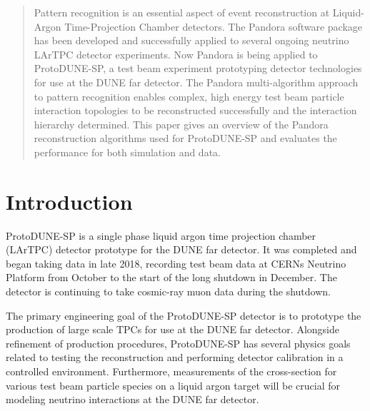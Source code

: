 
\date{Received: date / Accepted: date}

\maketitle

\begin{abstract}
Pattern recognition is an essential aspect of event reconstruction at Liquid-Argon Time-Projection Chamber detectors.  The Pandora software package has been developed and successfully applied to several ongoing neutrino LArTPC detector experiments.  Now Pandora is being applied to ProtoDUNE-SP, a test beam experiment prototyping detector technologies for use at the DUNE far detector.  The Pandora multi-algorithm approach to pattern recognition enables complex, high energy test beam particle interaction topologies to be reconstructed successfully and the interaction hierarchy determined.  This paper gives an overview of the Pandora reconstruction algorithms used for ProtoDUNE-SP and evaluates the performance for both simulation and data.
\end{abstract}

\section{Introduction}
\label{sec:intro}
ProtoDUNE-SP is a single phase liquid argon time projection chamber (LArTPC) detector prototype for the DUNE far detector.  It was completed and began taking data in late 2018, recording test beam data at CERNs Neutrino Platform from October to the start of the long shutdown in December.  The detector is continuing to take cosmic-ray muon data during the shutdown.  

The primary engineering goal of the ProtoDUNE-SP detector is to prototype the production of large scale TPCs for use at the DUNE far detector.  Alongside refinement of production procedures, ProtoDUNE-SP has several physics goals related to testing the reconstruction and performing detector calibration in a controlled environment.  Furthermore, measurements of the cross-section for various test beam particle species on a liquid argon target will be crucial for modeling neutrino interactions at the DUNE far detector.

